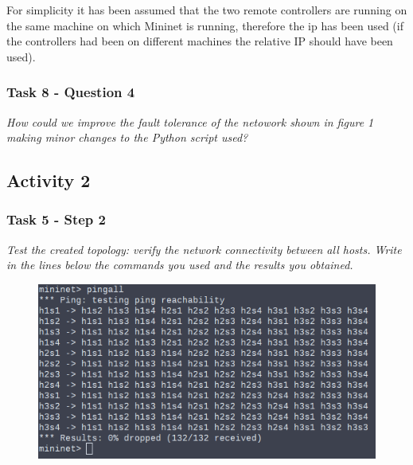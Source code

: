 For simplicity it has been assumed that the two remote controllers are running on the same machine on
which Mininet is running, therefore the ip  has been used (if the
controllers had been on different machines the relative IP should have been used).




\subsubsection*{Task 8 - Question 4}
\textit{How could we improve the fault tolerance of the netowork shown
in figure 1 making minor changes to the Python script used?}







\subsection*{Activity 2}
\subsubsection*{Task 5 - Step 2}
\textit{Test the created topology: verify the network connectivity between all hosts.
Write in the lines below the commands you used and the results you obtained.}
\begin{figure}[htb]
	\centering
	\includegraphics[width=0.8\linewidth]{img/activity-2-task-5-step-2.png}
\end{figure}



